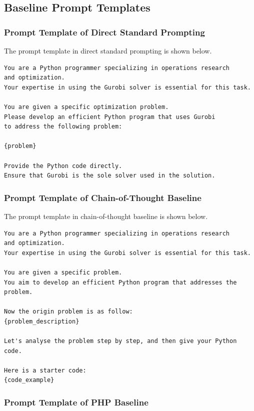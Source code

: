 \documentclass[letterpaper,onecolumn,12pt]{IEEEtran}
\begin{document}
\subsection{Baseline Prompt Templates}

\subsubsection{Prompt Template of Direct Standard Prompting}
\label{app:prompt_standard}

The prompt template in direct standard prompting is shown below.
\begin{lstlisting}[style=promptstyle]
You are a Python programmer specializing in operations research
and optimization.
Your expertise in using the Gurobi solver is essential for this task.

You are given a specific optimization problem.
Please develop an efficient Python program that uses Gurobi
to address the following problem:

{problem}

Provide the Python code directly.
Ensure that Gurobi is the sole solver used in the solution.
\end{lstlisting}

\subsubsection{Prompt Template of Chain-of-Thought Baseline}
\label{app:prompt_cot}

The prompt template in chain-of-thought baseline is shown below.
\begin{lstlisting}[style=promptstyle]
You are a Python programmer specializing in operations research
and optimization.
Your expertise in using the Gurobi solver is essential for this task.

You are given a specific problem.
You aim to develop an efficient Python program that addresses the problem.

Now the origin problem is as follow:
{problem_description}

Let's analyse the problem step by step, and then give your Python code.

Here is a starter code:
{code_example}
\end{lstlisting}

\subsubsection{Prompt Template of PHP Baseline}
\label{app:prompt_php}
\end{document}
